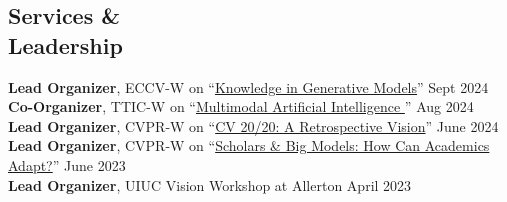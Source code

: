 \documentclass[margin,line]{res}
\newenvironment{list2}{
  \begin{list}{$\bullet$}{%
      \setlength{\itemsep}{0in}
      \setlength{\parsep}{0in} \setlength{\parskip}{0in}
      \setlength{\topsep}{0in} \setlength{\partopsep}{0in} 
      \setlength{\leftmargin}{0.2in}}}{\end{list}}
\begin{document}
\begin{resume}
\section{\sc \large Services \& \\ Leadership}
{\bf Lead Organizer}, ECCV-W on ``\href{https://sites.google.com/ttic.edu/knowledge-in-generative-models/home}{Knowledge in Generative Models}'' {\hfill Sept 2024} \\
{\bf Co-Organizer}, TTIC-W on ``\href{https://sites.google.com/view/multimodal-ai-ttic-2024/home}{Multimodal Artificial Intelligence
}'' {\hfill Aug 2024} \\
{\bf Lead Organizer}, CVPR-W on ``\href{https://sites.google.com/view/retrocv/}{CV 20/20: A Retrospective Vision}'' {\hfill June 2024}\\
{\bf Lead Organizer}, CVPR-W on ``\href{https://sites.google.com/view/academic-cv/}{Scholars \& Big Models: How Can Academics Adapt?}'' {\hfill June 2023}\\
{\bf Lead Organizer}, UIUC Vision Workshop at Allerton {\hfill April 2023}\\

\end{resume}
\end{document}
